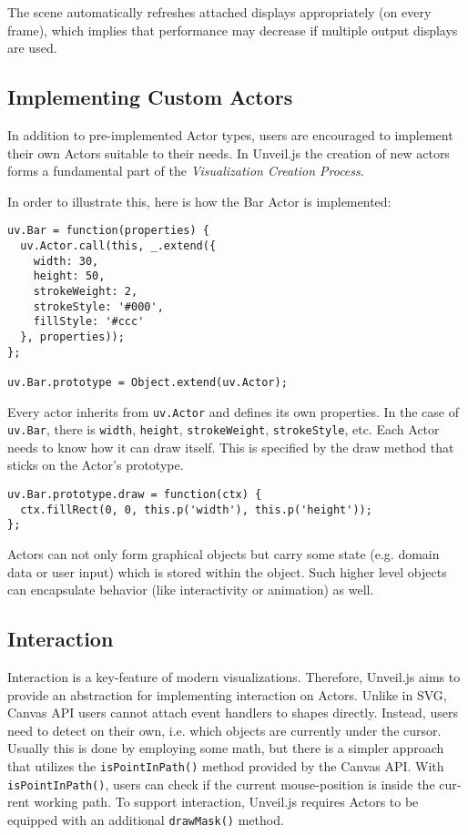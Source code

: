 \begin{english}
\SuperPar The scene automatically refreshes attached displays appropriately (on every frame), which implies that performance may decrease if multiple output displays are used.

\subsection{Implementing Custom Actors}

In addition to pre-implemented Actor types, users are encouraged to implement their own Actors suitable to their needs. In Unveil.js the creation of new actors forms a fundamental part of the \emph{Visualization Creation Process}.

\SuperPar In order to illustrate this, here is how the Bar Actor is implemented:

\begin{verbatim}
uv.Bar = function(properties) {
  uv.Actor.call(this, _.extend({
    width: 30,
    height: 50,
    strokeWeight: 2,
    strokeStyle: '#000',
    fillStyle: '#ccc'
  }, properties));
};

uv.Bar.prototype = Object.extend(uv.Actor);
\end{verbatim}

\SuperPar Every actor inherits from \texttt{uv.Actor} and defines its own properties. In the case of \texttt{uv.Bar}, there is \texttt{width}, \texttt{height}, \texttt{strokeWeight}, \texttt{strokeStyle}, etc. Each Actor needs to know how it can draw itself. This is specified by the draw method that sticks on the Actor's prototype.

\begin{verbatim}
uv.Bar.prototype.draw = function(ctx) {
  ctx.fillRect(0, 0, this.p('width'), this.p('height'));
};
\end{verbatim}

\SuperPar Actors can not only form graphical objects but carry some state (e.g. domain data or user input) which is stored within the object. Such higher level objects can encapsulate behavior (like interactivity or animation) as well.


\subsection{Interaction}

Interaction is a key-feature of modern visualizations. Therefore, Unveil.js aims to provide an abstraction for implementing interaction on Actors. Unlike in SVG, Canvas API users cannot attach event handlers to shapes directly. Instead, users need to detect on their own, i.e. which objects are currently under the cursor. Usually this is done by employing some math, but there is a simpler approach that utilizes the \texttt{isPointInPath()} method provided by the Canvas API. With \texttt{isPointInPath()}, users can check if the current mouse-position is inside the current working path. To support interaction, Unveil.js requires Actors to be equipped with an additional \texttt{drawMask()} method.


\end{english}
